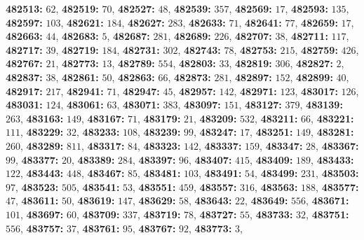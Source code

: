 \textsf{\bfseries 482513:} $62$, \textsf{\bfseries 482519:} $70$, \textsf{\bfseries 482527:} $48$, \textsf{\bfseries 482539:} $357$, \textsf{\bfseries 482569:} $17$, \textsf{\bfseries 482593:} $135$, \textsf{\bfseries 482597:} $103$, \textsf{\bfseries 482621:} $184$, \textsf{\bfseries 482627:} $283$, \textsf{\bfseries 482633:} $71$, \textsf{\bfseries 482641:} $77$, \textsf{\bfseries 482659:} $17$, \textsf{\bfseries 482663:} $44$, \textsf{\bfseries 482683:} $5$, \textsf{\bfseries 482687:} $281$, \textsf{\bfseries 482689:} $226$, \textsf{\bfseries 482707:} $38$, \textsf{\bfseries 482711:} $117$, \textsf{\bfseries 482717:} $39$, \textsf{\bfseries 482719:} $184$, \textsf{\bfseries 482731:} $302$, \textsf{\bfseries 482743:} $78$, \textsf{\bfseries 482753:} $215$, \textsf{\bfseries 482759:} $426$, \textsf{\bfseries 482767:} $21$, \textsf{\bfseries 482773:} $13$, \textsf{\bfseries 482789:} $554$, \textsf{\bfseries 482803:} $33$, \textsf{\bfseries 482819:} $306$, \textsf{\bfseries 482827:} $2$, \textsf{\bfseries 482837:} $38$, \textsf{\bfseries 482861:} $50$, \textsf{\bfseries 482863:} $66$, \textsf{\bfseries 482873:} $281$, \textsf{\bfseries 482897:} $152$, \textsf{\bfseries 482899:} $40$, \textsf{\bfseries 482917:} $217$, \textsf{\bfseries 482941:} $71$, \textsf{\bfseries 482947:} $45$, \textsf{\bfseries 482957:} $142$, \textsf{\bfseries 482971:} $123$, \textsf{\bfseries 483017:} $126$, \textsf{\bfseries 483031:} $124$, \textsf{\bfseries 483061:} $63$, \textsf{\bfseries 483071:} $383$, \textsf{\bfseries 483097:} $151$, \textsf{\bfseries 483127:} $379$, \textsf{\bfseries 483139:} $263$, \textsf{\bfseries 483163:} $149$, \textsf{\bfseries 483167:} $71$, \textsf{\bfseries 483179:} $21$, \textsf{\bfseries 483209:} $532$, \textsf{\bfseries 483211:} $66$, \textsf{\bfseries 483221:} $111$, \textsf{\bfseries 483229:} $32$, \textsf{\bfseries 483233:} $108$, \textsf{\bfseries 483239:} $99$, \textsf{\bfseries 483247:} $17$, \textsf{\bfseries 483251:} $149$, \textsf{\bfseries 483281:} $260$, \textsf{\bfseries 483289:} $811$, \textsf{\bfseries 483317:} $84$, \textsf{\bfseries 483323:} $142$, \textsf{\bfseries 483337:} $159$, \textsf{\bfseries 483347:} $28$, \textsf{\bfseries 483367:} $99$, \textsf{\bfseries 483377:} $20$, \textsf{\bfseries 483389:} $284$, \textsf{\bfseries 483397:} $96$, \textsf{\bfseries 483407:} $415$, \textsf{\bfseries 483409:} $189$, \textsf{\bfseries 483433:} $122$, \textsf{\bfseries 483443:} $448$, \textsf{\bfseries 483467:} $85$, \textsf{\bfseries 483481:} $103$, \textsf{\bfseries 483491:} $54$, \textsf{\bfseries 483499:} $231$, \textsf{\bfseries 483503:} $97$, \textsf{\bfseries 483523:} $505$, \textsf{\bfseries 483541:} $53$, \textsf{\bfseries 483551:} $459$, \textsf{\bfseries 483557:} $316$, \textsf{\bfseries 483563:} $188$, \textsf{\bfseries 483577:} $47$, \textsf{\bfseries 483611:} $50$, \textsf{\bfseries 483619:} $147$, \textsf{\bfseries 483629:} $58$, \textsf{\bfseries 483643:} $22$, \textsf{\bfseries 483649:} $556$, \textsf{\bfseries 483671:} $101$, \textsf{\bfseries 483697:} $60$, \textsf{\bfseries 483709:} $337$, \textsf{\bfseries 483719:} $78$, \textsf{\bfseries 483727:} $55$, \textsf{\bfseries 483733:} $32$, \textsf{\bfseries 483751:} $556$, \textsf{\bfseries 483757:} $37$, \textsf{\bfseries 483761:} $95$, \textsf{\bfseries 483767:} $92$, \textsf{\bfseries 483773:} $3$, 
